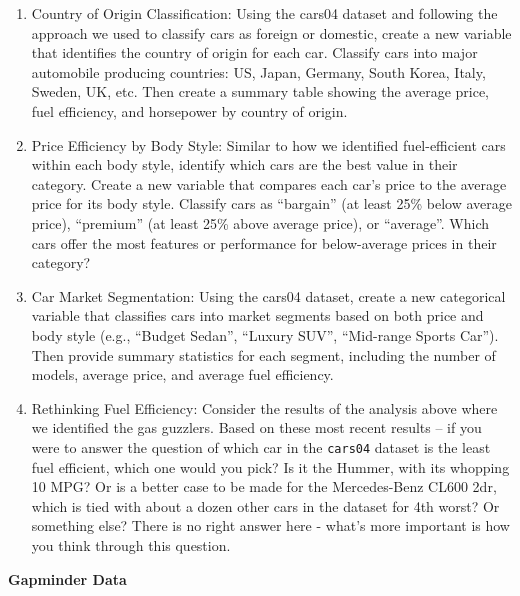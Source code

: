 \documentclass[
  letterpaper,
]{book}
\begin{document}
\begin{enumerate}
\def\labelenumi{\arabic{enumi}.}
\item
  Country of Origin Classification: Using the cars04 dataset and
  following the approach we used to classify cars as foreign or
  domestic, create a new variable that identifies the country of origin
  for each car. Classify cars into major automobile producing countries:
  US, Japan, Germany, South Korea, Italy, Sweden, UK, etc. Then create a
  summary table showing the average price, fuel efficiency, and
  horsepower by country of origin.
\item
  Price Efficiency by Body Style: Similar to how we identified
  fuel-efficient cars within each body style, identify which cars are
  the best value in their category. Create a new variable that compares
  each car's price to the average price for its body style. Classify
  cars as ``bargain'' (at least 25\% below average price), ``premium''
  (at least 25\% above average price), or ``average''. Which cars offer
  the most features or performance for below-average prices in their
  category?
\item
  Car Market Segmentation: Using the cars04 dataset, create a new
  categorical variable that classifies cars into market segments based
  on both price and body style (e.g., ``Budget Sedan'', ``Luxury SUV'',
  ``Mid-range Sports Car''). Then provide summary statistics for each
  segment, including the number of models, average price, and average
  fuel efficiency.
\item
  Rethinking Fuel Efficiency: Consider the results of the analysis above
  where we identified the gas guzzlers. Based on these most recent
  results -- if you were to answer the question of which car in the
  \texttt{cars04} dataset is the least fuel efficient, which one would
  you pick? Is it the Hummer, with its whopping 10 MPG? Or is a better
  case to be made for the Mercedes-Benz CL600 2dr, which is tied with
  about a dozen other cars in the dataset for 4th worst? Or something
  else? There is no right answer here - what's more important is how you
  think through this question.
\end{enumerate}

\textbf{Gapminder Data}
\end{document}
